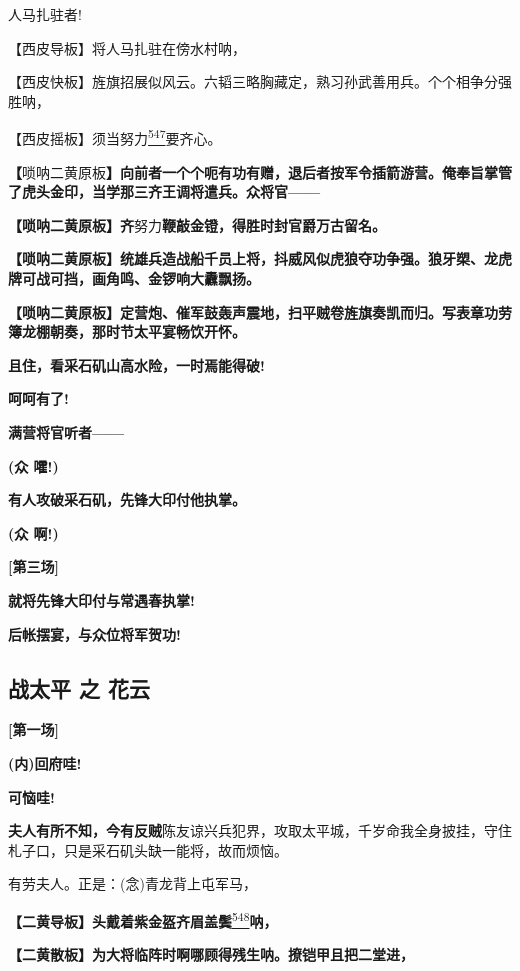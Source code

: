 人马扎驻者!

【西皮导板】将人马扎驻在傍水村呐，

【西皮快板】旌旗招展似风云。六韬三略胸藏定，熟习孙武善用兵。个个相争分强胜呐，

【西皮摇板】须当努力\protect\hyperlink{fn547}{\textsuperscript{547}}要齐心。

\textbf{【}唢呐二黄原板\textbf{】向前者一个个呃有功有赠，退后者按军令插箭游营。俺奉旨掌管了虎头金印，当学那三齐王调将遣兵。众将官------}

\textbf{【唢呐二黄原板】齐}努力\textbf{鞭敲金镫，得胜时封官爵万古留名。}

\textbf{【唢呐二黄原板】统雄兵造战船千员上将，抖威风似虎狼夺功争强。狼牙槊、龙虎牌可战可挡，画角鸣、金锣响大纛飘扬。}

\textbf{【唢呐二黄原板】定营炮、催军鼓轰声震地，扫平贼卷旌旗奏凯而归。写表章功劳簿龙棚朝奏，那时节太平宴畅饮开怀。}

\textbf{且住，看采石矶山高水险，一时焉能得破!}

\textbf{呵呵有了!}

\textbf{满营将官听者------}

\textbf{(众 嚯!)}

\textbf{有人攻破采石矶，先锋大印付他执掌。}

\textbf{(众 啊!)}

\textbf{{[}第三场{]}}

\textbf{就将先锋大印付与常遇春执掌!}

\textbf{后帐摆宴，与众位将军贺功!}

\newpage
\hypertarget{ux6218ux592aux5e73-ux4e4b-ux82b1ux4e91}{%
\subsection{战太平 之
花云}\label{ux6218ux592aux5e73-ux4e4b-ux82b1ux4e91}}

\textbf{{[}第一场{]}}

\textbf{(内)回府哇!}

\textbf{可恼哇!}

\textbf{夫人有所不知，今有反贼}陈友谅兴兵犯界，攻取太平城，千岁命我全身披挂，守住札子口，只是采石矶头缺一能将，故而烦恼。

有劳夫人。正是：(念)青龙背上屯军马，

\textbf{【二黄导板】头戴着紫金盔齐眉盖鬓}\protect\hyperlink{fn548}{\textsuperscript{548}}\textbf{呐，}

\textbf{【二黄散板】为大将临阵时啊哪顾得残生呐。撩铠甲且把二堂进，}

